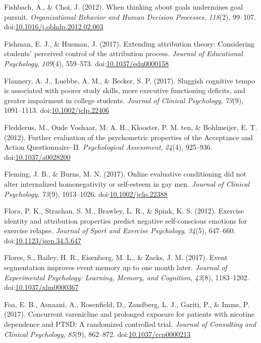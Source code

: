 \documentclass[english,man]{apa6}
\begin{document}
\hypertarget{ref-Fishbach2012}{}
Fishbach, A., \& Choi, J. (2012). When thinking about goals undermines
goal pursuit. \emph{Organizational Behavior and Human Decision
Processes}, \emph{118}(2), 99--107.
doi:\href{https://doi.org/10.1016/j.obhdp.2012.02.003}{10.1016/j.obhdp.2012.02.003}

\hypertarget{ref-Fishman2017}{}
Fishman, E. J., \& Husman, J. (2017). Extending attribution theory:
Considering students' perceived control of the attribution process.
\emph{Journal of Educational Psychology}, \emph{109}(4), 559--573.
doi:\href{https://doi.org/10.1037/edu0000158}{10.1037/edu0000158}

\hypertarget{ref-Flannery2017}{}
Flannery, A. J., Luebbe, A. M., \& Becker, S. P. (2017). Sluggish
cognitive tempo is associated with poorer study skills, more executive
functioning deficits, and greater impairment in college students.
\emph{Journal of Clinical Psychology}, \emph{73}(9), 1091--1113.
doi:\href{https://doi.org/10.1002/jclp.22406}{10.1002/jclp.22406}

\hypertarget{ref-Fledderus2012}{}
Fledderus, M., Oude Voshaar, M. A. H., Klooster, P. M. ten, \&
Bohlmeijer, E. T. (2012). Further evaluation of the psychometric
properties of the Acceptance and Action Questionnaire--II.
\emph{Psychological Assessment}, \emph{24}(4), 925--936.
doi:\href{https://doi.org/10.1037/a0028200}{10.1037/a0028200}

\hypertarget{ref-Fleming2017}{}
Fleming, J. B., \& Burns, M. N. (2017). Online evaluative conditioning
did not alter internalized homonegativity or self-esteem in gay men.
\emph{Journal of Clinical Psychology}, \emph{73}(9), 1013--1026.
doi:\href{https://doi.org/10.1002/jclp.22388}{10.1002/jclp.22388}

\hypertarget{ref-Flora2012}{}
Flora, P. K., Strachan, S. M., Brawley, L. R., \& Spink, K. S. (2012).
Exercise identity and attribution properties predict negative
self-conscious emotions for exercise relapse. \emph{Journal of Sport and
Exercise Psychology}, \emph{34}(5), 647--660.
doi:\href{https://doi.org/10.1123/jsep.34.5.647}{10.1123/jsep.34.5.647}

\hypertarget{ref-Flores2017}{}
Flores, S., Bailey, H. R., Eisenberg, M. L., \& Zacks, J. M. (2017).
Event segmentation improves event memory up to one month later.
\emph{Journal of Experimental Psychology: Learning, Memory, and
Cognition}, \emph{43}(8), 1183--1202.
doi:\href{https://doi.org/10.1037/xlm0000367}{10.1037/xlm0000367}

\hypertarget{ref-Foa2017a}{}
Foa, E. B., Asnaani, A., Rosenfield, D., Zandberg, L. J., Gariti, P., \&
Imms, P. (2017). Concurrent varenicline and prolonged exposure for
patients with nicotine dependence and PTSD: A randomized controlled
trial. \emph{Journal of Consulting and Clinical Psychology},
\emph{85}(9), 862--872.
doi:\href{https://doi.org/10.1037/ccp0000213}{10.1037/ccp0000213}
\end{document}
